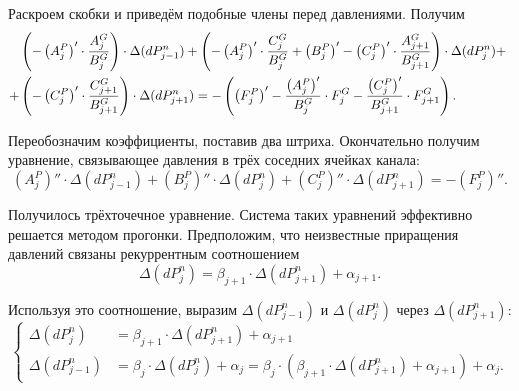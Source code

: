 Раскроем скобки и приведём подобные члены перед давлениями. Получим
\begin{align}
\label{formula64}
&\left(-\left(A_j^P \right)' \cdot \frac{A_j^G}{B_j^G} \right) \cdot \Delta(dP_{j-1}^n)+\left(-\left(A_j^P \right)' \cdot \frac{C_j^G}{B_j^G} + \left(B_j^P \right)' - \left(C_j^P \right)'\cdot \frac{A_{j+1}^G}{B_{j+1}^G} \right)\cdot \Delta(dP_j^n) + \notag ~\\
+&\left(- \left(C_j^P \right)'\cdot \frac{C_{j+1}^G}{B_{j+1}^G}   \right)\cdot\Delta(dP_{j+1}^n) = -\left(\left(F_j^P \right)' - \frac{\left(A_j^P \right)'}{B_j^G}\cdot F_j^G - \frac{\left(C_j^P \right)'}{B_{j+1}^G}\cdot F_{j+1}^G \right).   
\end{align}

Переобозначим коэффициенты, поставив два штриха. Окончательно получим уравнение, связывающее давления в трёх соседних ячейках канала:
\begin{equation}
\label{formula65}
\boxed{\left(A_j^P \right)'' \cdot \Delta(dP_{j-1}^n) + \left(B_j^P \right)'' \cdot \Delta(dP_j^n) + \left(C_j^P \right)'' \cdot \Delta(dP_{j+1}^n) = -\left(F_j^P \right)''}.
\end{equation}

Получилось трёхточечное уравнение. Система таких уравнений эффективно решается методом прогонки. Предположим, что неизвестные приращения давлений связаны рекуррентным соотношением
\begin{equation}
\label{formula66}
\Delta(dP_j^n)=\beta_{j+1} \cdot \Delta(dP_{j+1}^n) + \alpha_{j+1}.
\end{equation}

Используя это соотношение, выразим $\Delta(dP_{j-1}^n)$ и $\Delta(dP_j^n)$ через $\Delta(dP_{j+1}^n)$:
\begin{equation}
\label{formula67}
\left\{
\begin{aligned}
\Delta(dP_j^n) & = \beta_{j+1} \cdot \Delta(dP_{j+1}^n) + \alpha_{j+1} \\
\Delta(dP_{j-1}^n) & = \beta_j \cdot \Delta(dP_j^n) + \alpha_j = \beta_j \cdot (\beta_{j+1} \cdot \Delta(dP_{j+1}^n) + \alpha_{j+1}) + \alpha_j.
\end{aligned}
\right.
\end{equation}

